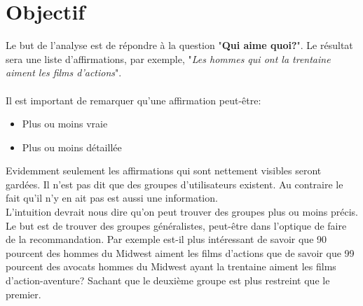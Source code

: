 \chapter{Objectif}

Le but de l'analyse est de répondre à la question "\textbf{Qui aime quoi?}". Le résultat sera une liste d'affirmations, par exemple, "\emph{Les hommes qui ont la trentaine aiment les films d'actions}".\\
\vspace{5mm}
\\Il est important de remarquer qu'une affirmation peut-être:
\begin{itemize}
  \item Plus ou moins vraie
  \item Plus ou moins détaillée
\end{itemize}
Evidemment seulement les affirmations qui sont nettement visibles seront gardées. Il n'est pas dit que des groupes d'utilisateurs existent. Au contraire le fait qu'il n'y en ait pas est aussi une information.
\vspace{5mm}
\\L'intuition devrait nous dire qu'on peut trouver des groupes plus ou moins précis. Le but est de trouver des groupes généralistes, peut-être dans l'optique de faire de la recommandation. Par exemple est-il plus intéressant de savoir que 90 pourcent des hommes du Midwest aiment les films d'actions que de savoir que 99 pourcent des avocats hommes du Midwest ayant la trentaine aiment les films d'action-aventure? Sachant que le deuxième groupe est plus restreint que le premier.